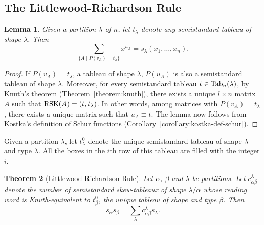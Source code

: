 \documentclass[11pt]{amsart}
\newtheorem{theorem}{Theorem}[subsection]
\newtheorem{lemma}[theorem]{Lemma}
\theoremstyle{definition}
\theoremstyle{example}
\newcommand{\Tab}{\textup{Tab}}
\newcommand{\rsk}{\textup{RSK}}
\begin{document}
\subsection{The Littlewood-Richardson Rule}
\label{sec:littlewood-richardson}
\begin{lemma}
  \label{lemma:section}
  Given a partition $\lambda$ of $n$, let $t_\lambda$ denote \emph{any} semistandard tableau of shape $\lambda$.
  Then
  \begin{displaymath}
    \sum_{\{A\mid P(v_A) = t_\lambda\}} x^{u_A} = s_\lambda(x_1,\dotsc,x_n).
  \end{displaymath}
\end{lemma}
\begin{proof}
  If $P(v_A) = t_\lambda$, a tableau of shape $\lambda$, $P(u_A)$ is also a semistandard tableau of shape $\lambda$.
  Moreover, for every semistandard tableau $t\in \Tab_n(\lambda)$,  by Knuth's theorem (Theorem~\ref{theorem:knuth}), there exists a unique $l\times n$ matrix $A$ such that $\rsk(A) = (t, t_\lambda)$.
  In other words, among matrices with $P(v_A)=t_\lambda$, there exists a unique matrix such that $u_A\equiv t$.
  The lemma now follows from Kostka's definition of Schur functions (Corollary~\ref{corollary:kostka-def-schur}).
\end{proof}
Given a partition $\lambda$, let $t^0_\lambda$ denote the unique semistandard tableau of shape $\lambda$ and type $\lambda$.
All the boxes in the $i$th row of this tableau are filled with the integer $i$.
\begin{theorem}
  [Littlewood-Richardson Rule]
  Let $\alpha$, $\beta$ and $\lambda$ be partitions.
  Let $c^\lambda_{\alpha\beta}$ denote the number of semistandard skew-tableaux of shape $\lambda/\alpha$ whose reading word is Knuth-equivalent to $t^0_\beta$, the unique tableau of shape and type $\beta$.
  Then
  \begin{displaymath}
    s_\alpha s_\beta = \sum_\lambda c^\lambda_{\alpha\beta} s_\lambda.
  \end{displaymath}
\end{theorem}
\end{document}
